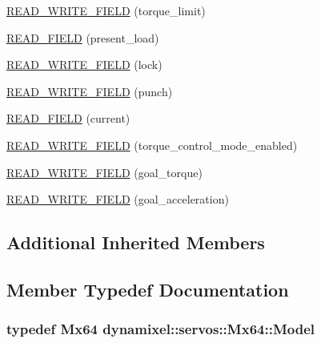 \begin{DoxyCompactItemize}
\item 
\hyperlink{classdynamixel_1_1servos_1_1_mx64_aa1571236546d16cc3cfe42e24108766b}{R\+E\+A\+D\+\_\+\+W\+R\+I\+T\+E\+\_\+\+F\+I\+E\+L\+D} (torque\+\_\+limit)
\item 
\hyperlink{classdynamixel_1_1servos_1_1_mx64_ad8a89f122af0f01757dda68a458bd328}{R\+E\+A\+D\+\_\+\+F\+I\+E\+L\+D} (present\+\_\+load)
\item 
\hyperlink{classdynamixel_1_1servos_1_1_mx64_ab2012b3a61a0cd990874e023a22f3a34}{R\+E\+A\+D\+\_\+\+W\+R\+I\+T\+E\+\_\+\+F\+I\+E\+L\+D} (lock)
\item 
\hyperlink{classdynamixel_1_1servos_1_1_mx64_ae633aa605a331952962ed6dd63dd6431}{R\+E\+A\+D\+\_\+\+W\+R\+I\+T\+E\+\_\+\+F\+I\+E\+L\+D} (punch)
\item 
\hyperlink{classdynamixel_1_1servos_1_1_mx64_a31ee6cd22dfbc866ecf478f586b7e5c9}{R\+E\+A\+D\+\_\+\+F\+I\+E\+L\+D} (current)
\item 
\hyperlink{classdynamixel_1_1servos_1_1_mx64_a5bcff2870ae93bbf66bcd2244e7ac58e}{R\+E\+A\+D\+\_\+\+W\+R\+I\+T\+E\+\_\+\+F\+I\+E\+L\+D} (torque\+\_\+control\+\_\+mode\+\_\+enabled)
\item 
\hyperlink{classdynamixel_1_1servos_1_1_mx64_ae2b1cc35128f0e4aca54aca034c34d34}{R\+E\+A\+D\+\_\+\+W\+R\+I\+T\+E\+\_\+\+F\+I\+E\+L\+D} (goal\+\_\+torque)
\item 
\hyperlink{classdynamixel_1_1servos_1_1_mx64_a98489b5b6f7280a63f92e57b48610762}{R\+E\+A\+D\+\_\+\+W\+R\+I\+T\+E\+\_\+\+F\+I\+E\+L\+D} (goal\+\_\+acceleration)
\end{DoxyCompactItemize}
\subsection*{Additional Inherited Members}


\subsection{Member Typedef Documentation}
\hypertarget{classdynamixel_1_1servos_1_1_mx64_ae5a27a1b2e179fcfb77035708795f849}{}
\subsubsection[{Model}]{\setlength{\rightskip}{0pt plus 5cm}typedef {\bf Mx64} {\bf dynamixel\+::servos\+::\+Mx64\+::\+Model}}\label{classdynamixel_1_1servos_1_1_mx64_ae5a27a1b2e179fcfb77035708795f849}


